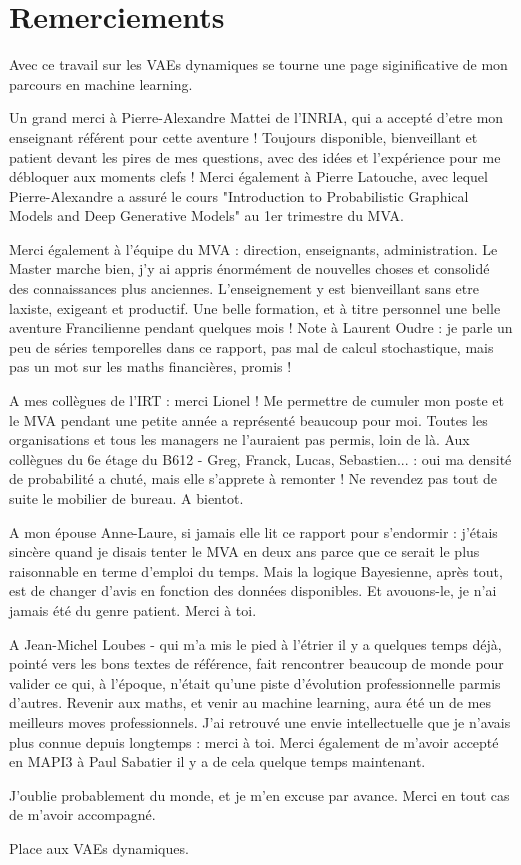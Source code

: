 \chapter{Remerciements}\label{sec:Remerciements}

Avec ce travail sur les VAEs dynamiques se tourne une page siginificative de mon parcours en machine learning.

Un grand merci à Pierre-Alexandre Mattei de l'INRIA, qui a accepté d'etre mon enseignant référent pour cette aventure !
Toujours disponible, bienveillant et patient devant les pires de mes questions, avec des idées et l'expérience 
pour me débloquer aux moments clefs ! Merci également à Pierre Latouche, avec lequel Pierre-Alexandre a assuré 
le cours "Introduction to Probabilistic Graphical Models and Deep Generative Models" au 1er trimestre du MVA.

Merci également à l'équipe du MVA : direction, enseignants, administration. Le Master marche bien, j'y ai appris 
énormément de nouvelles choses et consolidé des connaissances plus anciennes. L'enseignement y est bienveillant sans 
etre laxiste, exigeant et productif. Une belle formation, et à titre personnel une belle aventure Francilienne 
pendant quelques mois ! Note à Laurent Oudre : je parle un peu de séries temporelles dans ce rapport, pas mal de 
calcul stochastique, mais pas un mot sur les maths financières, promis !

A mes collègues de l'IRT : merci Lionel ! Me permettre de cumuler mon poste et le MVA pendant une petite année a 
représenté beaucoup pour moi. Toutes les organisations et tous les managers ne l'auraient pas permis, loin de là. 
Aux collègues du 6e étage du B612 - Greg, Franck, Lucas, Sebastien... : oui ma densité de probabilité a chuté, 
mais elle s'apprete à remonter ! Ne revendez pas tout de suite le mobilier de bureau. A bientot.

A mon épouse Anne-Laure, si jamais elle lit ce rapport pour s'endormir : j'étais sincère quand je disais tenter le MVA en deux ans 
parce que ce serait le plus raisonnable en terme d'emploi du temps. Mais la logique Bayesienne, après tout, est de changer d'avis 
en fonction des données disponibles. Et avouons-le, je n'ai jamais été du genre patient. Merci à toi.

A Jean-Michel Loubes - qui m'a mis le pied à l'étrier il y a quelques temps déjà, pointé vers les bons textes de référence, fait 
rencontrer beaucoup de monde pour valider ce qui, à l'époque, n'était qu'une piste d'évolution professionnelle parmis d'autres. 
Revenir aux maths, et venir au machine learning, aura été un de mes meilleurs moves professionnels. J'ai retrouvé une envie 
intellectuelle que je n'avais plus connue depuis longtemps : merci à toi. 
Merci également de m'avoir accepté en MAPI3 à Paul Sabatier il y a de cela quelque temps maintenant.

J'oublie probablement du monde, et je m'en excuse par avance. Merci en tout cas de m'avoir accompagné.

Place aux VAEs dynamiques.